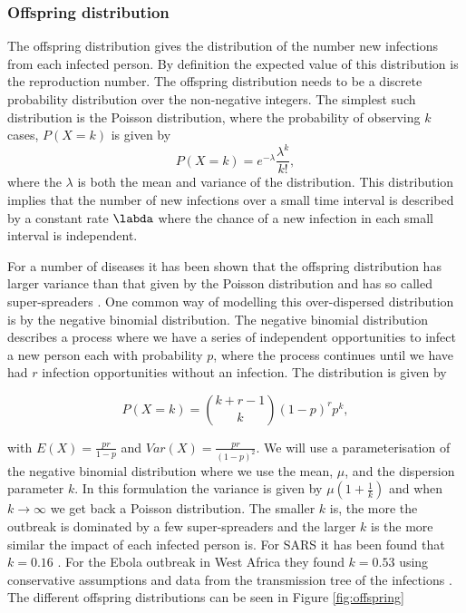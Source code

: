 \documentclass[12pt]{article}
\begin{document}
\subsubsection{Offspring distribution}
The offspring distribution gives the distribution of the number new infections from each infected person. By definition the expected value of this distribution is the reproduction number. The offspring distribution needs to be a discrete probability distribution over the non-negative integers. The simplest such distribution is the Poisson distribution, where the probability of observing $k$ cases, $P(X=k)$ is given by
\[P(X=k) = e^{-\lambda}\frac{\lambda^k}{k!}, \]
where the $\lambda$ is both the mean and variance of the distribution. This distribution implies that the number of new infections over a small time interval is described by a constant rate $\labda$ where the chance of a new infection in each small interval is independent.

For a number of diseases it has been shown that the offspring distribution has larger variance than that given by the Poisson distribution and has so called super-spreaders \cite{lloyd-smithSuperspreadingEffectIndividual2005}. One common way of modelling this over-dispersed distribution is by the negative binomial distribution. The negative binomial distribution describes a process where we have a series of independent opportunities to infect a new person each with probability $p$, where the process continues until we have had $r$ infection opportunities without an infection. The distribution is given by

\[P(X=k) = {k + r - 1 \choose k} (1-p)^rp^k, \]

with $E(X)=\frac{pr}{1-p}$ and $Var(X) = \frac{pr}{(1-p)^2}$. We will use a parameterisation of the negative binomial distribution where we use the mean, $\mu$, and the dispersion parameter $k$. In this formulation the variance is given by $\mu(1 + \frac{1}{k})$ and when $k \rightarrow \infty$ we get back a Poisson distribution. The smaller $k$ is, the more the outbreak is dominated by a few super-spreaders and the larger $k$ is the more similar the impact of each infected person is. For SARS it has been found that $k=0.16$ \cite{lloyd-smithSuperspreadingEffectIndividual2005}. For the Ebola outbreak in West Africa they found $k=0.53$ using conservative assumptions and data from the transmission tree of the infections \cite{internationalebolaresponseteamExposurePatternsDriving2016}. The different offspring distributions can be seen in Figure \ref{fig:offspring}
\end{document}
